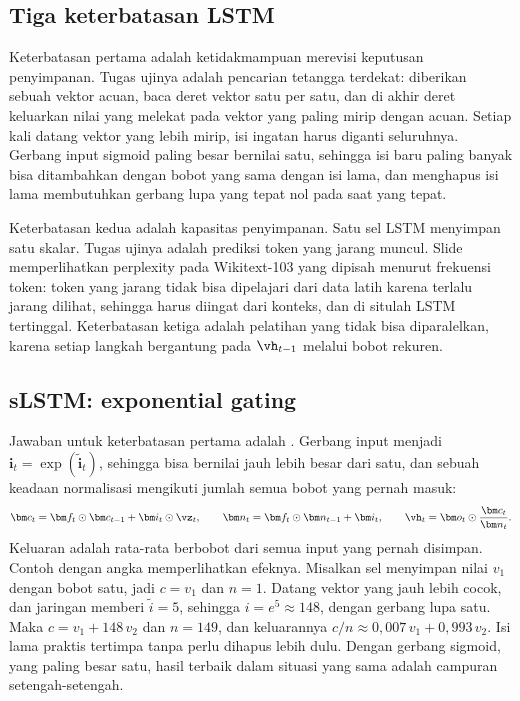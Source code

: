 \subsection{Tiga keterbatasan LSTM}

Keterbatasan pertama adalah ketidakmampuan merevisi keputusan penyimpanan. Tugas ujinya adalah pencarian tetangga
terdekat: diberikan sebuah vektor acuan, baca deret vektor satu per satu, dan di akhir deret keluarkan nilai yang
melekat pada vektor yang paling mirip dengan acuan. Setiap kali datang vektor yang lebih mirip, isi ingatan harus
diganti seluruhnya. Gerbang input sigmoid paling besar bernilai satu, sehingga isi baru paling banyak bisa
ditambahkan dengan bobot yang sama dengan isi lama, dan menghapus isi lama membutuhkan gerbang lupa yang tepat nol
pada saat yang tepat.

Keterbatasan kedua adalah kapasitas penyimpanan. Satu sel LSTM menyimpan satu skalar. Tugas ujinya adalah prediksi
token yang jarang muncul. Slide memperlihatkan perplexity pada Wikitext-103 yang dipisah menurut frekuensi token:
token yang jarang tidak bisa dipelajari dari data latih karena terlalu jarang dilihat, sehingga harus diingat dari
konteks, dan di situlah LSTM tertinggal. Keterbatasan ketiga adalah pelatihan yang tidak bisa diparalelkan, karena
setiap langkah bergantung pada $\vh_{t-1}$ melalui bobot rekuren.

\subsection{sLSTM: exponential gating}

Jawaban untuk keterbatasan pertama adalah . Gerbang input menjadi
$\bm i_t=\exp(\tilde{\bm i}_t)$, sehingga bisa bernilai jauh lebih besar dari satu, dan sebuah keadaan normalisasi
mengikuti jumlah semua bobot yang pernah masuk:
\begin{equation}
\bm c_t=\bm f_t\odot\bm c_{t-1}+\bm i_t\odot\vz_t,\qquad
\bm n_t=\bm f_t\odot\bm n_{t-1}+\bm i_t,\qquad
\vh_t=\bm o_t\odot\frac{\bm c_t}{\bm n_t}.
\end{equation}
Keluaran adalah rata-rata berbobot dari semua input yang pernah disimpan. Contoh dengan angka memperlihatkan efeknya.
Misalkan sel menyimpan nilai $v_1$ dengan bobot satu, jadi $c=v_1$ dan $n=1$. Datang vektor yang jauh lebih cocok, dan
jaringan memberi $\tilde i=5$, sehingga $i=e^5\approx148$, dengan gerbang lupa satu. Maka $c=v_1+148\,v_2$ dan $n=149$,
dan keluarannya $c/n\approx0{,}007\,v_1+0{,}993\,v_2$. Isi lama praktis tertimpa tanpa perlu dihapus lebih dulu. Dengan
gerbang sigmoid, yang paling besar satu, hasil terbaik dalam situasi yang sama adalah campuran setengah-setengah.

